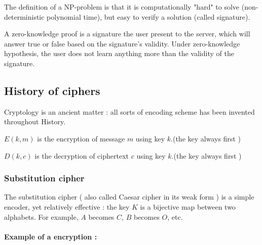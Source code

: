 The definition of a NP-problem is that it is computationally "hard" to solve (non-deterministic polynomial time), but easy to verify a solution (called signature).

A zero-knowledge proof is a signature the user present to the server, which will answer true or false based on the signature's validity. Under zero-knowledge hypothesis, the user does not learn anything more than the validity of the signature.

\subsection{History of ciphers}

Cryptology is an ancient matter : all sorts of encoding scheme has been invented throughout History. 

\begin{mydef}
	$E(k,m)$ is the encryption of message $m$ using key $k$.(the key always first ) 
\end{mydef}
\begin{mydef}
	$D(k,c)$ is the decryption of ciphertext $c$ using key $k$.(the key always first ) 
\end{mydef}

\subsubsection{Substitution cipher }
The substitution cipher ( also called Caesar cipher in its weak form ) is a simple encoder, yet relatively effective : the key $K$ is a bijective map between two alphabets. For example, $A$ becomes $C$, $B$ becomes $O$, etc.\\

\begin{table}[h!]
    \centering
	\caption{Exemple of a substitution table}
	\label{tab:SubstitionTable}
\end{table}

\paragraph{Example of a encryption : }


